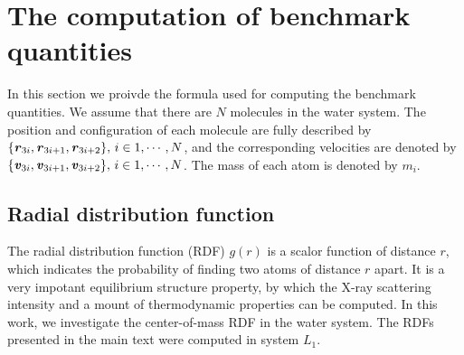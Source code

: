 \documentclass[aip,jcp,a4paper,preprint,unsortedaddress,onecolumn,fleqn]{revtex4-1}
\newcommand{\vect}[1]{\textbf{\textit{#1}}}
\newcommand{\systemlb}{L_1}
\begin{document}


\appendix

\section{The computation of benchmark quantities}
\label{appendix:benchmark}

In this section we proivde the formula used for computing the benchmark quantities. We assume that there are
$N$ molecules in the water system. The position and configuration of each molecule are fully described
by $\{\vect r_{3i},\vect r_{3i+1}, \vect r_{3i+2}\},\, i\in 1,\cdots,N$, and the corresponding velocities
are denoted by $\{\vect v_{3i},\vect v_{3i+1}, \vect v_{3i+2}\},\, i\in 1,\cdots,N$. The mass of each
atom is denoted by $m_i$.

\subsection{Radial distribution function}
The radial distribution function (RDF) $g(r)$ is a scalor function of distance $r$, which indicates the
probability of finding two atoms of distance $r$ apart.  It is a very
impotant equilibrium structure property, by which the X-ray scattering
intensity and a mount of thermodynamic properties can be computed.
In this work, we investigate the center-of-mass RDF in the water
system. The RDFs presented in the main text were computed in system $\systemlb$.

\end{document}
